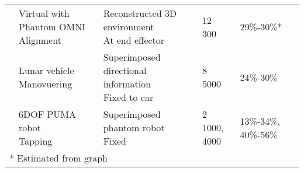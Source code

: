 \begin{table}[]
{\begin{tabular}{@{}lllll@{}}
	\addlinespace
	\cite{Rachmielowski2010} & \makecell[lt]{Virtual with Phantom OMNI\\ Alignment}          & \makecell[lt]{Reconstructed 3D environment\\ At end effector}              & \makecell[lt]{12\\ 300}           & 29\%-30\%*            \\
	\addlinespace
	\cite{Mathan1996}        & \makecell[lt]{Lunar vehicle\\ Manovuering}                    & \makecell[lt]{Superimposed directional information\\ Fixed to car}         & \makecell[lt]{8\\ 5000}           & 24\%-30\%            \\
	\addlinespace
	\cite{Bejczy1990}        & \makecell[lt]{6DOF PUMA robot\\ Tapping}                      & \makecell[lt]{Superimposed phantom robot\\ Fixed}                          & \makecell[lt]{2\\ 1000, 4000}     & 13\%-34\%, 40\%-56\% \\ \bottomrule
	\multicolumn{5}{l}{* Estimated from graph}
	\end{tabular}
}
\end{table}